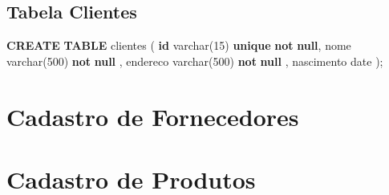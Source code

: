 \documentclass[
]{book}
\newenvironment{Shaded}{\begin{snugshade}}{\end{snugshade}}
\newcommand{\DataTypeTok}[1]{\textcolor[rgb]{0.13,0.29,0.53}{#1}}
\newcommand{\DecValTok}[1]{\textcolor[rgb]{0.00,0.00,0.81}{#1}}
\newcommand{\KeywordTok}[1]{\textcolor[rgb]{0.13,0.29,0.53}{\textbf{#1}}}
\newcommand{\NormalTok}[1]{#1}
\begin{document}
\subsection{Tabela Clientes}\label{tabela-clientes-1}

\begin{Shaded}
\begin{Highlighting}[]
\KeywordTok{CREATE} \KeywordTok{TABLE}\NormalTok{ clientes}
\NormalTok{(}
\KeywordTok{id}         \DataTypeTok{varchar}\NormalTok{(}\DecValTok{15}\NormalTok{) }\KeywordTok{unique} \KeywordTok{not} \KeywordTok{null}\NormalTok{,}
\NormalTok{nome       }\DataTypeTok{varchar}\NormalTok{(}\DecValTok{500}\NormalTok{) }\KeywordTok{not} \KeywordTok{null}\NormalTok{ ,}
\NormalTok{endereco   }\DataTypeTok{varchar}\NormalTok{(}\DecValTok{500}\NormalTok{) }\KeywordTok{not} \KeywordTok{null}\NormalTok{ ,}
\NormalTok{nascimento }\DataTypeTok{date}
\NormalTok{);}
\end{Highlighting}
\end{Shaded}

\section{Cadastro de Fornecedores}\label{cadastro-de-fornecedores-1}

\section{Cadastro de Produtos}\label{cadastro-de-produtos-1}

  
\end{document}
